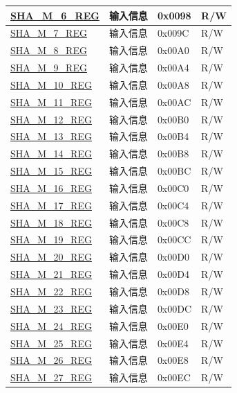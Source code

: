 \begin{longtable}{ | l| p{7.5cm} | p{1.3cm} | p{1cm} | }
\hyperref[regdesc:SHAMNREG]{SHA\_M\_6\_REG} & 输入信息 & 0x0098 & R/W \\ \hline
\hyperref[regdesc:SHAMNREG]{SHA\_M\_7\_REG} & 输入信息 & 0x009C & R/W \\ \hline
\hyperref[regdesc:SHAMNREG]{SHA\_M\_8\_REG} & 输入信息 & 0x00A0 & R/W \\ \hline
\hyperref[regdesc:SHAMNREG]{SHA\_M\_9\_REG} & 输入信息 & 0x00A4 & R/W \\ \hline
\hyperref[regdesc:SHAMNREG]{SHA\_M\_10\_REG} & 输入信息 & 0x00A8 & R/W \\ \hline
\hyperref[regdesc:SHAMNREG]{SHA\_M\_11\_REG} & 输入信息 & 0x00AC & R/W \\ \hline
\hyperref[regdesc:SHAMNREG]{SHA\_M\_12\_REG} & 输入信息 & 0x00B0 & R/W \\ \hline
\hyperref[regdesc:SHAMNREG]{SHA\_M\_13\_REG} & 输入信息 & 0x00B4 & R/W \\ \hline
\hyperref[regdesc:SHAMNREG]{SHA\_M\_14\_REG} & 输入信息 & 0x00B8 & R/W \\ \hline
\hyperref[regdesc:SHAMNREG]{SHA\_M\_15\_REG} & 输入信息 & 0x00BC & R/W \\ \hline
\hyperref[regdesc:SHAMNREG]{SHA\_M\_16\_REG} & 输入信息 & 0x00C0 & R/W \\ \hline
\hyperref[regdesc:SHAMNREG]{SHA\_M\_17\_REG} & 输入信息 & 0x00C4 & R/W \\ \hline
\hyperref[regdesc:SHAMNREG]{SHA\_M\_18\_REG} & 输入信息 & 0x00C8 & R/W \\ \hline
\hyperref[regdesc:SHAMNREG]{SHA\_M\_19\_REG} & 输入信息 & 0x00CC & R/W \\ \hline
\hyperref[regdesc:SHAMNREG]{SHA\_M\_20\_REG} & 输入信息 & 0x00D0 & R/W \\ \hline
\hyperref[regdesc:SHAMNREG]{SHA\_M\_21\_REG} & 输入信息 & 0x00D4 & R/W \\ \hline
\hyperref[regdesc:SHAMNREG]{SHA\_M\_22\_REG} & 输入信息 & 0x00D8 & R/W \\ \hline
\hyperref[regdesc:SHAMNREG]{SHA\_M\_23\_REG} & 输入信息 & 0x00DC & R/W \\ \hline
\hyperref[regdesc:SHAMNREG]{SHA\_M\_24\_REG} & 输入信息 & 0x00E0 & R/W \\ \hline
\hyperref[regdesc:SHAMNREG]{SHA\_M\_25\_REG} & 输入信息 & 0x00E4 & R/W \\ \hline
\hyperref[regdesc:SHAMNREG]{SHA\_M\_26\_REG} & 输入信息 & 0x00E8 & R/W \\ \hline
\hyperref[regdesc:SHAMNREG]{SHA\_M\_27\_REG} & 输入信息 & 0x00EC & R/W \\ \hline

\end{longtable}

